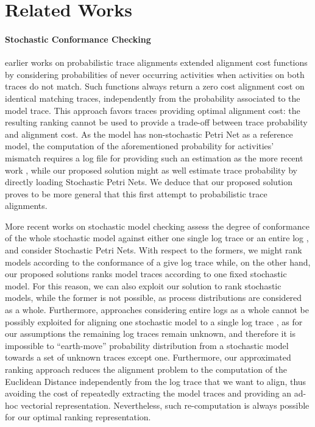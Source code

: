 \section{Related Works}
\paragraph*{Stochastic Conformance Checking} earlier works on probabilistic trace alignments \cite{AlizadehLZ14a} extended alignment cost functions by considering probabilities of never occurring activities when activities on both traces do not match. Such functions always return a zero cost alignment cost on identical matching traces, independently from the probability associated to the model trace. This approach favors traces providing optimal alignment cost: the resulting ranking cannot be used to provide a trade-off between trace probability and alignment cost. As the model has non-stochastic Petri Net as a reference model, the computation of the aforementioned probability for activities' mismatch requires a log file for providing such an estimation as the more recent work \cite{spdwe}, while our proposed solution might as well estimate trace probability by directly loading Stochastic Petri Nets. We  deduce that our proposed solution proves to be more general that this first attempt to probabilistic trace alignments. 

More recent works on stochastic model checking  assess the degree of conformance of the whole stochastic model against either one single log trace \cite{DBLP:conf/icpm/PolyvyanyyK19,DBLP:journals/tosem/PolyvyanyySWCM20} or an entire log \cite{LeemansSA19}, and consider Stochastic Petri Nets. %
With respect to the formers, we might rank models according to the conformance of a give log trace while, on the other hand, our proposed solutions ranks model traces according to one fixed stochastic model. For this reason, we can also exploit our solution to rank stochastic models, while the former is not possible, as process distributions are considered as a whole.  Furthermore, approaches considering entire logs as a whole cannot be possibly exploited for aligning one stochastic model to a single log trace \cite{LeemansSA19}, as for our assumptions the remaining log traces remain unknown, and therefore it is impossible to ``earth-move'' probability distribution from a stochastic model towards a set of unknown traces except one. Furthermore, our approximated ranking approach reduces the alignment problem to the computation of the Euclidean Distance independently from the log trace that we want to align, thus avoiding the cost of repeatedly extracting the model traces and providing an ad-hoc vectorial representation. Nevertheless, such re-computation is always possible for our optimal ranking representation.

